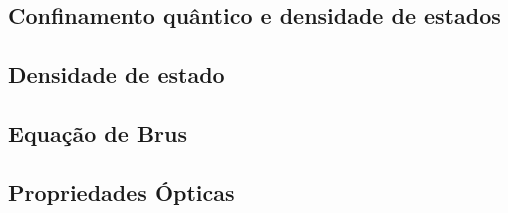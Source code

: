 
\subsection{Confinamento quântico e densidade de estados}
	

\subsection{Densidade de estado}
	

\subsection{Equação de Brus}
		

\subsection{Propriedades Ópticas}
	